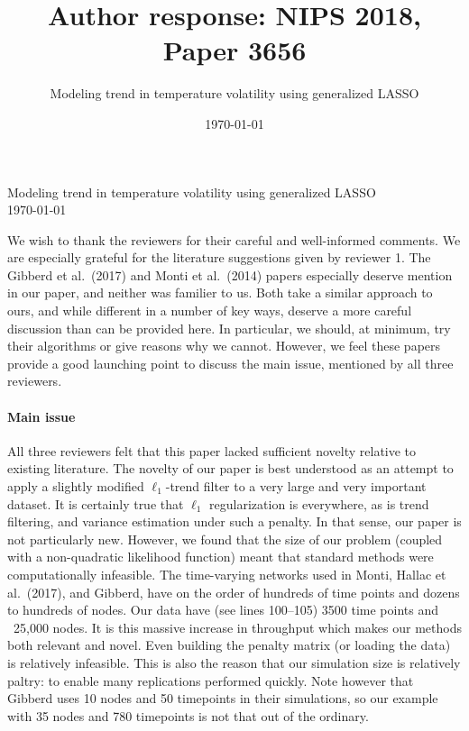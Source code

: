 \documentclass[11pt]{article}
\title{Author response: NIPS 2018, Paper 3656}
\author{Modeling trend in temperature volatility using generalized
  LASSO}
\date{\today}
\begin{document}
Modeling trend in temperature volatility using generalized
  LASSO\\
\today

\hspace{10pt}

We wish to thank the reviewers for their careful and well-informed
comments. We are especially grateful for the literature suggestions
given by reviewer 1. The Gibberd et al.\ (2017) and Monti et al.\ (2014) papers especially deserve
mention in our paper, and neither was familier to us. Both take a similar approach to ours, and while
different in a number of key ways, deserve a more careful discussion
than can be provided here. In particular, we should, at minimum, try
their algorithms or give reasons why we cannot. However, we feel these papers provide
a good launching point to discuss the main
issue, mentioned by all three reviewers.

\paragraph{Main issue} All three reviewers felt that this paper lacked sufficient novelty
relative to existing literature. The novelty of our paper is best understood as an attempt to
apply a slightly modified $\ell_1$-trend filter to a very large and
very important dataset. It is certainly true that $\ell_1$
regularization is everywhere, as is trend filtering, and variance
estimation under such a penalty. In that sense, our paper is not
particularly new. However, we found that the size of our problem
(coupled with a non-quadratic likelihood function) meant that standard
methods were computationally infeasible. The time-varying networks
used in Monti, Hallac et al.\ (2017), and Gibberd, have on the order of hundreds of
time points and dozens to hundreds of nodes. Our data have (see lines
100--105) 3500 time points and ~25,000 nodes. It is this massive
increase in throughput which makes our methods both relevant and
novel. Even building the penalty matrix (or loading the data) is
relatively infeasible. This is also the reason that our simulation
size is relatively paltry: to enable many replications performed
quickly. Note however that Gibberd uses 10 nodes and 50 timepoints in
their simulations, so our example with 35 nodes and 780 timepoints is
not that out of the ordinary.
\end{document}
